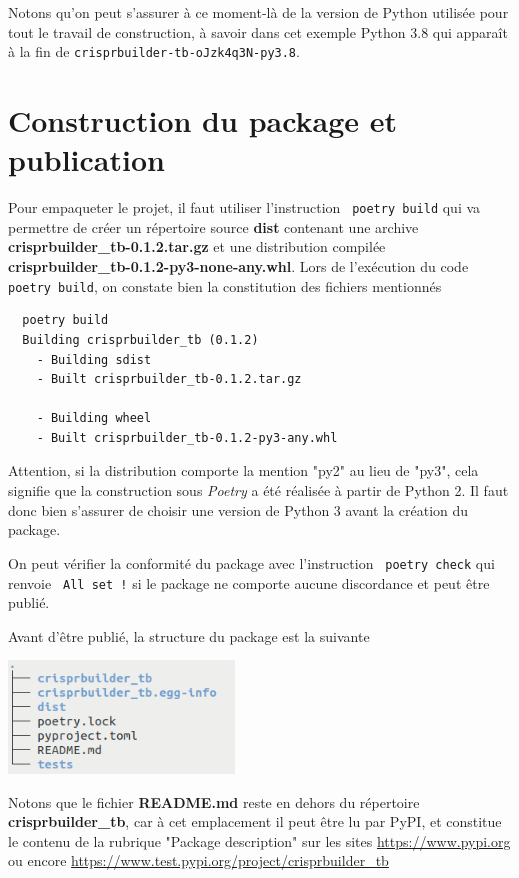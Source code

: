 \documentclass[twoside,a4paper,11pt,frenchb,openany]{report}
\begin{document}
Notons qu'on peut s'assurer à ce moment-là de la version de Python utilisée pour tout le travail de construction, à savoir dans cet exemple Python 3.8 qui apparaît à la fin de \texttt{crisprbuilder-tb-oJzk4q3N-py3.8}.




\section{Construction du package et publication}

Pour empaqueter le projet, il faut utiliser l’instruction
\texttt{ poetry build}
qui va permettre de créer un répertoire source \textbf{dist} contenant une archive \textbf{crisprbuilder\_tb-0.1.2.tar.gz} et une distribution compilée \textbf{crisprbuilder\_tb-0.1.2-py3-none-any.whl}. Lors de l'exécution du code \texttt{ poetry build}, on constate bien la constitution des fichiers mentionnés

\begin{verbatim}  poetry build
  Building crisprbuilder_tb (0.1.2)
    - Building sdist
    - Built crisprbuilder_tb-0.1.2.tar.gz

    - Building wheel
    - Built crisprbuilder_tb-0.1.2-py3-any.whl\end{verbatim}

Attention, si la distribution comporte la mention "py2" au lieu de "py3", cela signifie que la construction sous \textit{Poetry} a été réalisée à partir de Python 2. Il faut donc bien s'assurer de choisir une version de Python 3 avant la création du package.

On peut vérifier la conformité du package avec l’instruction
\texttt{ poetry check}
qui renvoie
\texttt{ All set !}
si le package ne comporte aucune discordance et peut être publié.

Avant d'être publié, la structure du package est la suivante

\includegraphics[width=6cm]{tree_level1.png}

Notons que le fichier \textbf{README.md} reste en dehors du répertoire \textbf{crisprbuilder\_tb}, car à cet emplacement il peut être lu par PyPI, et constitue le contenu de la rubrique "Package description" sur les sites \href{https://www.pypi.org}{https://www.pypi.org} ou encore \href{https://www.test.pypi.org/project/crisprbuilder\_tb}{https://www.test.pypi.org/project/crisprbuilder\_tb}
\end{document}
